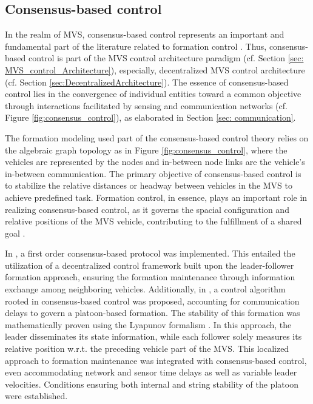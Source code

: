 \newpage

\subsection{Consensus-based control} \label{sec:consensus_control}

In the realm of MVS, consensus-based control represents an important and fundamental part of the literature related to formation control \cite{ren2008distributed}. Thus, consensus-based control is part of the MVS control architecture paradigm (cf. Section \ref{sec: MVS_control_Architecture}), especially, decentralized MVS control architecture (cf. Section \ref{sec:DecentralizedArchitecture}). The essence of consensus-based control lies in the convergence of individual entities toward a common objective through interactions facilitated by sensing and communication networks (cf. Figure \ref{fig:consensus_control}), as elaborated in Section \ref{sec: communication}. 

The formation modeling used part of the consensus-based control theory relies on the algebraic graph topology as in Figure \ref{fig:consensus_control}, where the vehicles are represented by the nodes and in-between node links are the vehicle's in-between communication. The primary objective of consensus-based control is to stabilize the relative distances or headway between vehicles in the MVS to achieve predefined task. Formation control, in essence, plays an important role in realizing consensus-based control, as it governs the spacial configuration and relative positions of the MVS vehicle, contributing to the fulfillment of a shared goal \cite{ren2008distributed}\cite{ma2017consensus}\cite{gao2022survey}.






In \cite{4283094}, a first order consensus-based protocol was implemented. This entailed the utilization of a decentralized control framework built upon the leader-follower formation approach, ensuring the formation maintenance through information exchange among neighboring vehicles. Additionally, in \cite{6891349}, a control algorithm rooted in consensus-based control was proposed, accounting for communication delays to govern a platoon-based formation. The stability of this formation was mathematically proven using the Lyapunov formalism \cite{khalifa2019vehicles}\cite{khalifa2018vehicles}. In this approach, the leader disseminates its state information, while each follower solely measures its relative position w.r.t. the preceding vehicle part of the MVS. This localized approach to formation maintenance was integrated with consensus-based control, even accommodating network and sensor time delays as well as variable leader velocities. Conditions ensuring both internal and string stability of the platoon were established. 



